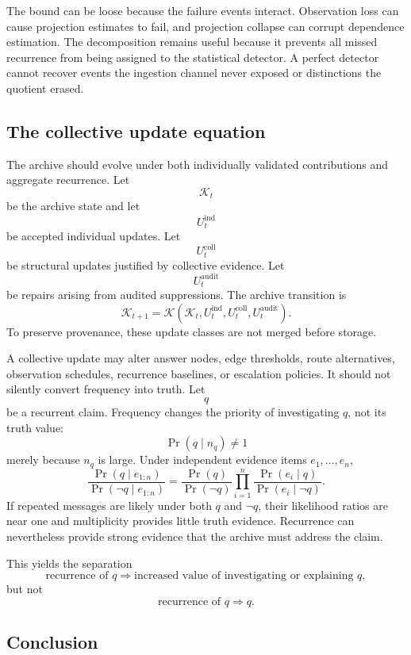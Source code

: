 \documentclass[11pt]{article}
\theoremstyle{definition}
\DeclareMathOperator{\Prob}{Pr}
\newcommand{\K}{\mathcal{K}}
\begin{document}
The bound can be loose because the failure events interact. Observation loss can cause projection estimates to fail, and projection collapse can corrupt dependence estimation. The decomposition remains useful because it prevents all missed recurrence from being assigned to the statistical detector. A perfect detector cannot recover events the ingestion channel never exposed or distinctions the quotient erased.

\subsection{The collective update equation}

The archive should evolve under both individually validated contributions and aggregate recurrence. Let
\[
\K_t
\]
be the archive state and let
\[
U_t^{\mathrm{ind}}
\]
be accepted individual updates. Let
\[
U_t^{\mathrm{coll}}
\]
be structural updates justified by collective evidence. Let
\[
U_t^{\mathrm{audit}}
\]
be repairs arising from audited suppressions. The archive transition is
\[
\K_{t+1}
=
\mathcal{K}\!\left(
\K_t,
U_t^{\mathrm{ind}},
U_t^{\mathrm{coll}},
U_t^{\mathrm{audit}}
\right).
\]
To preserve provenance, these update classes are not merged before storage.

A collective update may alter answer nodes, edge thresholds, route alternatives, observation schedules, recurrence baselines, or escalation policies. It should not silently convert frequency into truth. Let
\[
q
\]
be a recurrent claim. Frequency changes the priority of investigating \(q\), not its truth value:
\[
\Prob(q\mid n_q)
\neq
1
\]
merely because \(n_q\) is large. Under independent evidence items \(e_1,\ldots,e_n\),
\[
\frac{
\Prob(q\mid e_{1:n})
}{
\Prob(\neg q\mid e_{1:n})
}
=
\frac{\Prob(q)}{\Prob(\neg q)}
\prod_{i=1}^{n}
\frac{\Prob(e_i\mid q)}{\Prob(e_i\mid\neg q)}.
\]
If repeated messages are likely under both \(q\) and \(\neg q\), their likelihood ratios are near one and multiplicity provides little truth evidence. Recurrence can nevertheless provide strong evidence that the archive must address the claim.

This yields the separation
\[
\text{recurrence of }q
\Longrightarrow
\text{increased value of investigating or explaining }q,
\]
but not
\[
\text{recurrence of }q
\Longrightarrow
q.
\]

\subsection{Conclusion}
\end{document}
